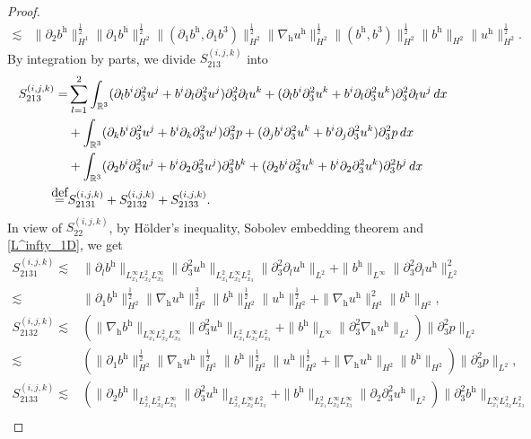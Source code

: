 \documentclass[10pt,a4paper]{amsart}
\newcommand{\R}{\mathbb{R}}
\newcommand{\dx}{\,{\rm d}x}
\def\eqdefa{\buildrel\hbox{\footnotesize def}\over =}
\newcommand{\h}{\mathrm{h}}
\newcommand{\nablah}{\nabla_{\mathrm{h}}}
\begin{document}
\begin{proof}
\begin{align}
		\lesssim&\|\partial_2b^\h\|_{H^1}^\frac12\|\partial_1b^\h\|_{H^2}^\frac12\|(\partial_1b^\h,\partial_1b^3)\|_{H^2}^\frac12\|\nablah u^\h\|_{H^2}^\frac12\|(b^\h,b^3)\|_{H^2}^\frac12\|b^\h\|_{H^2}\|u^\h\|_{H^2}^\frac12.
	\end{align}
	By integration by parts, we divide $S^{(i,j,k)}_{213}$ into
	\begin{align*}
		S^{(i,j,k)}_{213}=&\sum_{l=1}^{2}\int_{\R^3}(\partial_lb^i\partial_3^2u^j+b^i\partial_l\partial_3^2u^j)\partial_3^2\partial_l u^k+(\partial_lb^i\partial_3^2u^k+b^i\partial_l\partial_3^2u^k)\partial_3^2\partial_l u^j\dx\\
		&+\int_{\R^3}(\partial_kb^i\partial_3^2u^j+b^i\partial_k\partial_3^2u^j)\partial_3^2p+(\partial_jb^i\partial_3^2u^k+b^i\partial_j\partial_3^2u^k)\partial_3^2p\dx\\
		&+\int_{\R^3}(\partial_2b^i\partial_3^2u^j+b^i\partial_2\partial_3^2u^j)\partial_3^2b^k+(\partial_2b^i\partial_3^2u^k+b^i\partial_2\partial_3^2u^k)\partial_3^2b^j\dx\\
		\eqdefa& S^{(i,j,k)}_{2131}+S^{(i,j,k)}_{2132}+S^{(i,j,k)}_{2133}.
	\end{align*}
	In view of $S^{(i,j,k)}_{22}$, by H\"older's inequality, Sobolev embedding theorem and \eqref{L^infty_1D}, we get
	\begin{align}
		S^{(i,j,k)}_{2131}\lesssim&\|\partial_l b^\h\|_{L^\infty_{x_1}L^2_{x_2}L^\infty_{x_3}}\|\partial_3^2u^\h\|_{L^2_{x_1}L^\infty_{x_2}L^2_{x_3}}\|\partial_3^2\partial_l u^\h\|_{L^2}+\|b^\h\|_{L^\infty}\|\partial_3^2\partial_l u^\h\|_{L^2}^2\nonumber\\
		\lesssim&\|\partial_1b^\h\|_{H^2}^\frac12\|\nablah u^\h\|_{H^2}^\frac32\| b^\h\|_{H^2}^\frac12\| u^\h\|_{H^2}^\frac12+\|\nablah u^\h\|_{H^2}^2\|b^\h\|_{H^2},\nonumber\\\label{S2132.0}
		S^{(i,j,k)}_{2132}\lesssim&\left(\|\nablah b^\h\|_{L^\infty_{x_1}L^2_{x_2}L^\infty_{x_3}}\|\partial_3^2u^\h\|_{L^2_{x_1}L^\infty_{x_2}L^2_{x_3}}+\|b^\h\|_{L^\infty}\|\partial_3^2\nablah u^\h\|_{L^2}\right)\|\partial_3^2 p\|_{L^2}\nonumber\\
		\lesssim&\left(\|\partial_1b^\h\|_{H^2}^\frac12\|\nablah u^\h\|_{H^2}^\frac12\| b^\h\|_{H^2}^\frac12\| u^\h\|_{H^2}^\frac12+\|\nablah u^\h\|_{H^2}\|b^\h\|_{H^2}\right)\|\partial_3^2 p\|_{L^2},\\
		S^{(i,j,k)}_{2133}\lesssim&\left(\|\partial_2 b^\h\|_{L^2_{x_1}L^2_{x_2}L^\infty_{x_3}}\|\partial_3^2u^\h\|_{L^2_{x_1}L^\infty_{x_2}L^2_{x_3}}+\|b^\h\|_{L^2_{x_1}L^\infty_{x_2}L^\infty_{x_3}}\|\partial_2\partial_3^2 u^\h\|_{L^2}\right)\|\partial_3^2 b^\h\|_{L^\infty_{x_1}L^2_{x_2}L^2_{x_3}}\nonumber\\

\end{align}
\end{proof}
\end{document}
